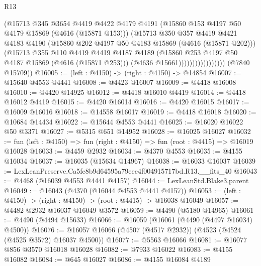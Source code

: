 \begin{lexlean}{R13}
\begin{coremodule}
                                (@15713
                                  @345
                                  @3654
                                  @4419
                                  @4422
                                  @4179
                                  @4191
                                  (@15860 @153 @4197 @50 @4179 @15869 (@4616 (@15871 @153)))
                                  (@15713
                                    @350
                                    @357
                                    @4419
                                    @4421
                                    @4183
                                    @4190
                                    (@15860 @202 @4197 @50 @4183 @15869 (@4616 (@15871 @202)))
                                    (@15713
                                      @355
                                      @110
                                      @4419
                                      @4419
                                      @4187
                                      @4189
                                      (@15860 @253 @4197 @50 @4187 @15869 (@4616 (@15871 @253)))
                                      (@4636 @15661)))))))))))))))))
      (@7840 @15709))
@16005 := (left : @4150) -> (right : @4150) -> @14854
@16007 := @15640 @4553 @4441
@16008 := @4423 @16007
@16009 := @4418 @16008
@16010 := @4420 @14925
@16012 := @4418 @16010 @4419
@16014 := @4418 @16012 @4419
@16015 := @4420 @16014
@16016 := @4420 @16015
@16017 := @16009 @16016
@16018 := @14558 @16017
@16019 := @4418 @16018
@16020 := @10684 @14434
@16022 := @15644 @4553 @4441
@16025 := @16020 @16022 @50 @3371
@16027 := @5315 @651 @14952
@16028 := @16025 @16027
@16032 := fun (left : @4150) => fun (right : @4150) => fun (root : @4415) => @16019 @16028
@16033 := @4459 @2932
@16034 := @4370 @4553
@16035 := @4155 @16034
@16037 := @16035 (@15634 @14967)
@16038 := @16033 @16037
@16039 := LexLeanPreserve.Ca5fe8b9d64595a79eee4f004915717bd.R13.__fits_40
@16043 := @4468 (@16039 @4553 @4441 @4157)
@16044 := LexLeanStd.Blake3.parent
@16049 := @16043 (@4370 (@16044 @4553 @4441 @4157))
@16053 := (left : @4150) -> (right : @4150) -> (root : @4415) -> @16038 @16049
@16057 := @4482 @2932 @16037 @16049 @3572
@16059 := @4490 (@5180 @14965)
@16061 := @4490 (@4494 @15633)
@16066 := @16059 (@16061 (@4490 (@4497 @16034) @4500))
@16076 := @16057 @16066 (@4507 (@4517 @2932)) (@4523 (@4524 (@4525 @3572) @16037 @4500))
@16077 := @5563 @16066
@16081 := @16077 @856 @3570 @16018 @16028
@16082 := @7933 @16022
@16083 := @4155 @16082
@16084 := @645 @16027
@16086 := @4155 @16084 @4189

\end{coremodule}
\end{lexlean}
